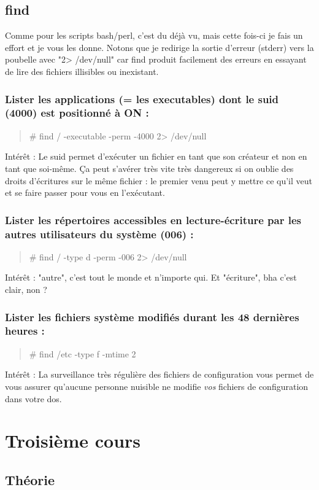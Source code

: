 \documentclass[a4paper,11pt]{article}
\newcommand{\commande}[1] {
    \begin{quote}
    \tt\raggedright #1 
    \end{quote}
}
\begin{document}
\subsection{find}
\par Comme pour les scripts bash/perl, c'est du déjà vu, mais cette fois-ci je fais un effort et je vous les donne. Notons que je redirige la sortie d'erreur (stderr) vers la poubelle avec "2> /dev/null" car find produit facilement des erreurs en essayant de lire des fichiers illisibles ou inexistant.
\subsubsection*{Lister les applications (= les executables) dont le suid (4000) est positionné à ON :}
\commande{\# find / -executable -perm -4000 2> /dev/null}
\par Intérêt : Le suid permet d'exécuter un fichier en tant que son créateur et non en tant que soi-même. Ça peut s'avérer très vite très dangereux si on oublie des droits d'écritures sur le même fichier : le premier venu peut y mettre ce qu'il veut et se faire passer pour vous en l'exécutant.
\subsubsection*{Lister les répertoires accessibles en lecture-écriture par les autres utilisateurs du système (006) :}
\commande{\# find / -type d -perm -006 2> /dev/null}
\par Intérêt : "autre", c'est tout le monde et n'importe qui. Et "écriture", bha c'est clair, non ?
\subsubsection*{Lister les fichiers système modifiés durant les 48 dernières heures :}
\commande{\# find /etc -type f -mtime 2}
\par Intérêt : La surveillance très régulière des fichiers de configuration vous permet de vous assurer qu'aucune personne nuisible ne modifie \emph{vos} fichiers de configuration dans votre dos.

\section{Troisième cours}
\subsection{Théorie}
\end{document}
